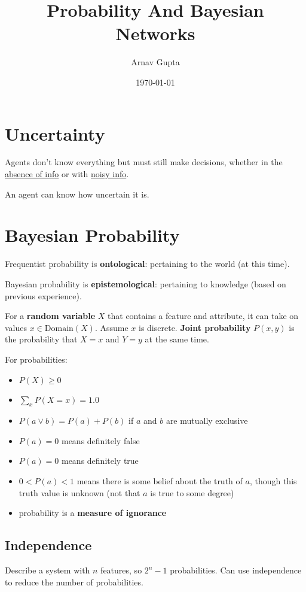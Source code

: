 \documentclass[11pt]{article}
\author{Arnav Gupta}
\date{\today}
\title{Probability And Bayesian Networks}
\begin{document}
\maketitle
\tableofcontents

\section{Uncertainty}
\label{sec:org719e06f}
Agents don't know everything but must still make decisions,
whether in the \uline{absence of info} or with \uline{noisy info}.

An agent can know how uncertain it is.
\section{Bayesian Probability}
\label{sec:org1ace1b9}
Frequentist probability is \textbf{ontological}: pertaining to the world (at this time).

Bayesian probability is \textbf{epistemological}: pertaining to knowledge (based on previous experience).

For a \textbf{random variable} \(X\) that contains a feature and attribute,
it can take on values \(x \in \text{Domain}(X)\).
Assume \(x\) is discrete.
\textbf{Joint probability} \(P(x,y)\) is the probability that \(X = x\) and \(Y = y\) at the same time.

For probabilities:
\begin{itemize}
\item \(P(X) \ge 0\)
\item \(\sum_{x} P(X = x) = 1.0\)
\item \(P(a \vee b) = P(a) + P(b)\) if \(a\) and \(b\) are mutually exclusive
\item \(P(a) = 0\) means definitely false
\item \(P(a) = 0\) means definitely true
\item \(0 < P(a) < 1\) means there is some belief about the truth of \(a\), though this truth value is unknown
(not that \(a\) is true to some degree)
\item probability is a \textbf{measure of ignorance}
\end{itemize}
\subsection{Independence}
\label{sec:orgf4b10b0}
Describe a system with \(n\) features, so \(2^{n} - 1\) probabilities.
Can use independence to reduce the number of probabilities.
\end{document}
